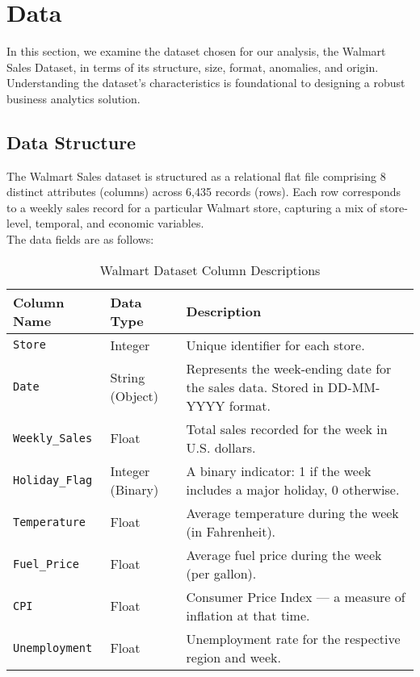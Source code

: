 %
%
%





\chapter{Data}

In this section, we examine the dataset chosen for our analysis, the Walmart Sales Dataset, in terms of its structure, size, format, anomalies, and origin. Understanding the dataset’s characteristics is foundational to designing a robust business analytics solution.\cite{Yasserh:WalmartDataset}

\section{Data Structure}

The Walmart Sales dataset is structured as a relational flat file comprising 8 distinct attributes (columns) across 6,435 records (rows). Each row corresponds to a weekly sales record for a particular Walmart store, capturing a mix of store-level, temporal, and economic variables.\cite{Yasserh:WalmartDataset} \\ 


The data fields are as follows:

\begin{table}[H]
	\centering
	\caption{Walmart Dataset Column Descriptions}
	\begin{tabular}{|l|l|p{9cm}|}
		\hline
		\textbf{Column Name} & \textbf{Data Type} & \textbf{Description} \\
		\hline
		\texttt{Store} & Integer & Unique identifier for each store. \\
		\hline
		\texttt{Date} & String (Object) & Represents the week-ending date for the sales data. Stored in DD-MM-YYYY format. \\
		\hline
		\texttt{Weekly\_Sales} & Float & Total sales recorded for the week in U.S. dollars. \\
		\hline
		\texttt{Holiday\_Flag} & Integer (Binary) & A binary indicator: 1 if the week includes a major holiday, 0 otherwise. \\
		\hline
		\texttt{Temperature} & Float & Average temperature during the week (in Fahrenheit). \\
		\hline
		\texttt{Fuel\_Price} & Float & Average fuel price during the week (per gallon). \\
		\hline
		\texttt{CPI} & Float & Consumer Price Index — a measure of inflation at that time. \\
		\hline
		\texttt{Unemployment} & Float & Unemployment rate for the respective region and week. \\
		\hline
	\end{tabular}
	\label{tab:walmart_columns}
\end{table}

